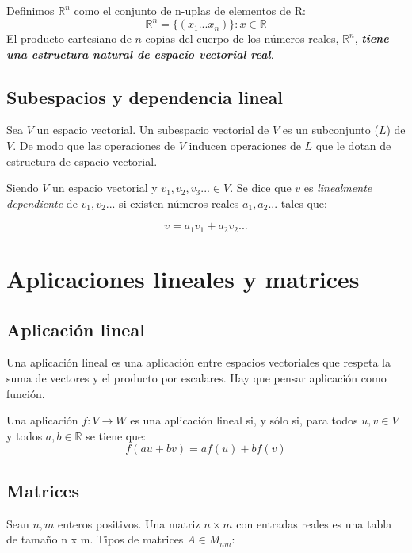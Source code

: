 \documentclass[11pt, oneside, titlepage]{article}
\begin{document}
Definimos $\mathds{R}^n$ como el conjunto de n-uplas de elementos de R:
\[\mathds{R}^n=\{(x_1...x_n)\} : x \in \mathds{R}\]
El producto cartesiano de $n$ copias del cuerpo de los números reales, $\mathds{R}^n$, \emph{\textbf{tiene una estructura natural de espacio vectorial real}}.

\subsection{Subespacios y dependencia lineal}
Sea $V$ un espacio vectorial. Un subespacio vectorial de $V$ es un subconjunto ($L$) de $V$. De modo que las operaciones de $V$ inducen operaciones de $L$ que le dotan de estructura de espacio vectorial.

Siendo $V$ un espacio vectorial y $v_1, v_2, v_3 ... \in V$. Se dice que $v$ es \emph{linealmente dependiente} de $v_1, v_2 ...$ si existen números reales $a_1, a_2...$ tales que:

\[
v=a_1 v_1+a_2v_2...
\]

\section{Aplicaciones lineales y matrices}
\subsection{Aplicación lineal}
Una aplicación lineal es una aplicación entre espacios vectoriales que respeta la suma de vectores y el producto por escalares. Hay que pensar aplicación como función.

Una aplicación $f : V \rightarrow W$ es una aplicación lineal si, y sólo si, para todos $u,v \in V$ y todos $a,b \in \mathds{R}$ se tiene que:
\[
f(au+bv)=af(u)+bf(v)
\]

\subsection{Matrices}
Sean $n,m$ enteros positivos. Una matriz $n \times m$ con entradas reales es una tabla de tamaño n x m. Tipos de matrices $A \in M_{nm}$:
\end{document}

